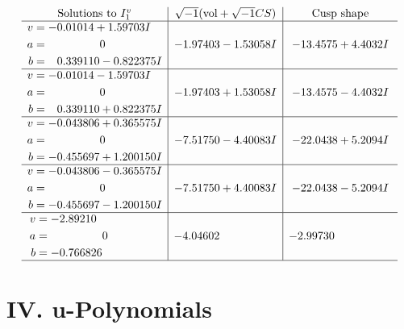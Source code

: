\documentclass[1p]{elsarticle_modified}
\theoremstyle{definition}
\newcommand{\I}{\sqrt{-1}}
\begin{document}
$$\begin{array}{c|c|c}  
\text{Solutions to }I^v_{1}& \I (\text{vol} + \sqrt{-1}CS) & \text{Cusp shape}\\
 \hline 
\begin{aligned}
v &= -0.01014 + 1.59703 I \\
a &= \phantom{-0.000000 } 0 \\
b &= \phantom{-}0.339110 - 0.822375 I\end{aligned}
 & -1.97403 - 1.53058 I & -13.4575 + 4.4032 I \\ \hline\begin{aligned}
v &= -0.01014 - 1.59703 I \\
a &= \phantom{-0.000000 } 0 \\
b &= \phantom{-}0.339110 + 0.822375 I\end{aligned}
 & -1.97403 + 1.53058 I & -13.4575 - 4.4032 I \\ \hline\begin{aligned}
v &= -0.043806 + 0.365575 I \\
a &= \phantom{-0.000000 } 0 \\
b &= -0.455697 + 1.200150 I\end{aligned}
 & -7.51750 - 4.40083 I & -22.0438 + 5.2094 I \\ \hline\begin{aligned}
v &= -0.043806 - 0.365575 I \\
a &= \phantom{-0.000000 } 0 \\
b &= -0.455697 - 1.200150 I\end{aligned}
 & -7.51750 + 4.40083 I & -22.0438 - 5.2094 I \\ \hline\begin{aligned}
v &= -2.89210\phantom{ +0.000000I} \\
a &= \phantom{-0.000000 } 0 \\
b &= -0.766826\phantom{ +0.000000I}\end{aligned}
 & -4.04602\phantom{ +0.000000I} & -2.99730\phantom{ +0.000000I}\\
 \hline 
 \end{array}$$\newpage
\newpage\renewcommand{\arraystretch}{1}
\centering \section*{ IV. u-Polynomials}
\end{document}
